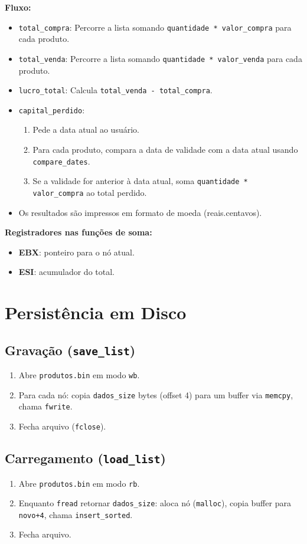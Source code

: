 \documentclass[12pt]{article}
\begin{document}
\textbf{Fluxo:}
\begin{itemize}
    \item \texttt{total\_compra}: Percorre a lista somando \texttt{quantidade * valor\_compra} para cada produto.
    \item \texttt{total\_venda}: Percorre a lista somando \texttt{quantidade * valor\_venda} para cada produto.
    \item \texttt{lucro\_total}: Calcula \texttt{total\_venda - total\_compra}.
    \item \texttt{capital\_perdido}:
        \begin{enumerate}
            \item Pede a data atual ao usuário.
            \item Para cada produto, compara a data de validade com a data atual usando \texttt{compare\_dates}.
            \item Se a validade for anterior à data atual, soma \texttt{quantidade * valor\_compra} ao total perdido.
        \end{enumerate}
    \item Os resultados são impressos em formato de moeda (reais.centavos).
\end{itemize}

\textbf{Registradores nas funções de soma:}
\begin{itemize}
    \item \textbf{EBX}: ponteiro para o nó atual.
    \item \textbf{ESI}: acumulador do total.
\end{itemize}

\section{Persistência em Disco}
\subsection{Gravação (\texttt{save\_list})}
\begin{enumerate}
  \item Abre \texttt{produtos.bin} em modo \texttt{wb}.
  \item Para cada nó: copia \texttt{dados\_size} bytes (offset 4) para um buffer via \texttt{memcpy}, chama \texttt{fwrite}.
  \item Fecha arquivo (\texttt{fclose}).
\end{enumerate}

\subsection{Carregamento (\texttt{load\_list})}
\begin{enumerate}
  \item Abre \texttt{produtos.bin} em modo \texttt{rb}.
  \item Enquanto \texttt{fread} retornar \texttt{dados\_size}: aloca nó (\texttt{malloc}), copia buffer para \texttt{novo+4}, chama \texttt{insert\_sorted}.
  \item Fecha arquivo.
\end{enumerate}
\end{document}

